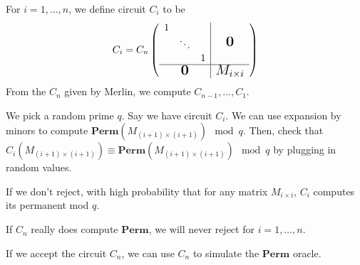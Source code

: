 \documentclass[letterpaper, 12pt]{article}
\newcommand{\Perm}{\mathbf{Perm}}
\begin{document}
For $i = 1, \dots, n$, we define circuit $C_i$ to be
	\[C_i = C_n
	\left(
	\begin{array}{c | c}
	\begin{matrix}
	1 & &\\
	& \ddots &\\
	& & 1
	\end{matrix} & \Large{\mbox{$\mathbf{0}$}}\\ \hline
	\Large{\mbox{$\mathbf{0}$}} & \Large{\mbox{$M_{i\times i}$}} 
	\end{array}
	\right)
	\]
From the $C_n$ given by Merlin, we compute $C_{n-1}, \dots, C_1$.

We pick a random prime $q$. Say we have circuit $C_i$. We can use expansion by minors to compute $\Perm(M_{(i+1)\times(i+1)}) \mod q$. Then, check that $C_i(M_{(i+1) \times (i+1)}) \equiv \Perm(M_{(i+1) \times (i+1)}) \mod q$ by plugging in random values.

If we don't reject, with high probability that for any matrix $M_{i\times i}$,  $C_i$ computes its permanent mod $q$.

If $C_n$ really does compute $\Perm$, we will never reject for $i = 1, \dots, n$.

If we accept the circuit $C_n$, we can use $C_n$ to simulate the $\Perm$ oracle.
\end{document}
